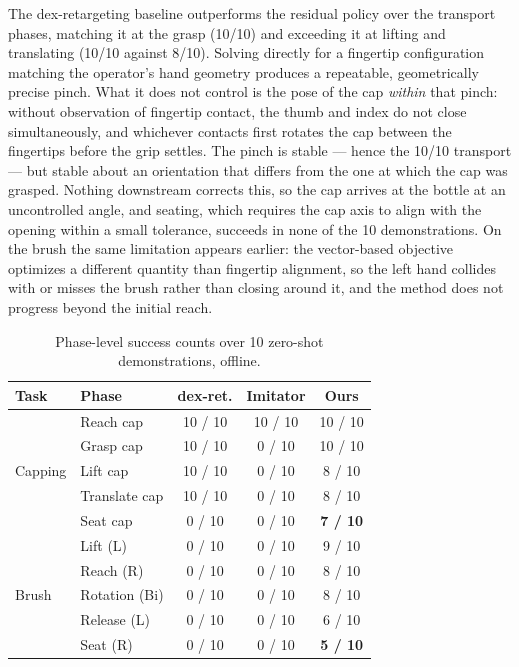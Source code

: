 \documentclass[letterpaper, 10 pt, conference]{ieeeconf}
\begin{document}
The dex-retargeting baseline outperforms the residual policy over the transport phases,
matching it at the grasp (10/10) and exceeding it at lifting and translating (10/10
against 8/10). Solving directly for a fingertip configuration matching the operator's
hand geometry produces a repeatable, geometrically precise pinch. What it does not
control is the pose of the cap \emph{within} that pinch: without observation of
fingertip contact, the thumb and index do not close simultaneously, and whichever
contacts first rotates the cap between the fingertips before the grip settles. The pinch
is stable --- hence the 10/10 transport --- but stable about an orientation that differs
from the one at which the cap was grasped. Nothing downstream corrects this, so the cap
arrives at the bottle at an uncontrolled angle, and seating, which requires the cap axis
to align with the opening within a small tolerance, succeeds in none of the 10
demonstrations. On the brush the same limitation appears earlier: the vector-based
objective optimizes a different quantity than fingertip alignment, so the left hand
collides with or misses the brush rather than closing around it, and the method does not
progress beyond the initial reach.

\begin{table}[tb]
    \centering
    \caption{Phase-level success counts over 10 zero-shot demonstrations, offline.}
    \label{tab:offline}
    \begin{tabular}{llccc}
        \toprule
        \textbf{Task} & \textbf{Phase} & \textbf{dex-ret.} & \textbf{Imitator} & \textbf{Ours} \\
        \midrule
        \multirow{5}{*}{Capping}
            & Reach cap          & 10 / 10 & 10 / 10 & 10 / 10 \\
            & Grasp cap          & 10 / 10 &  0 / 10 & 10 / 10 \\
            & Lift cap           & 10 / 10 &  0 / 10 &  8 / 10 \\
            & Translate cap      & 10 / 10 &  0 / 10 &  8 / 10 \\
            & Seat cap           &  0 / 10 &  0 / 10 &  \textbf{7 / 10} \\
        \midrule
        \multirow{5}{*}{Brush}
            & Lift (L)           &  0 / 10 &  0 / 10 &  9 / 10 \\
            & Reach (R)          &  0 / 10 &  0 / 10 &  8 / 10 \\
            & Rotation (Bi)      &  0 / 10 &  0 / 10 &  8 / 10 \\
            & Release (L)        &  0 / 10 &  0 / 10 &  6 / 10 \\
            & Seat (R)           &  0 / 10 &  0 / 10 &  \textbf{5 / 10} \\
        \bottomrule
    \end{tabular}
\end{table}
\end{document}
